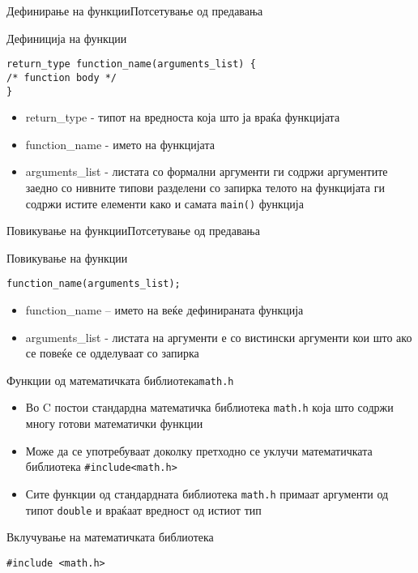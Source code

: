 \begin{frame}[fragile]{Дефинирање на функции}{Потсетување од предавања}
\begin{block}{Дефиниција на функции}
\begin{lstlisting}
return_type function_name(arguments_list) {
/* function body */
}
\end{lstlisting}
\end{block}
\begin{itemize}
    \item return\_type - типот на вредноста која што ја враќа функцијата
    \item function\_name - името на функцијата
    \item arguments\_list - листата со формални аргументи ги содржи аргументите
    заедно со нивните типови разделени со запирка телото на функцијата ги содржи истите елементи како и самата \texttt{main()} функција    
\end{itemize}
\end{frame}

\begin{frame}[fragile]{Повикување на функции}{Потсетување од предавања}
\begin{block}{Повикување на функции}
\begin{lstlisting}
function_name(arguments_list);
\end{lstlisting}
\end{block}
\begin{itemize}
    \item function\_name – името на веќе дефинираната  функција
    \item arguments\_list - листата на аргументи е со вистински аргументи кои
    што ако се повеќе се одделуваат со запирка
\end{itemize}
\end{frame}

\begin{frame}[fragile]{Функции од математичката библиотека}{\texttt{math.h}}
\begin{itemize}
    \item Во C постои стандардна математичка библиотека \texttt{math.h} која што содржи многу готови математички функции
    \item Може да се употребуваат доколку претходно се уклучи математичката
    библиотека \texttt{\#include<math.h>}
    \item Сите функции од стандардната библиотека \texttt{math.h} примаат аргументи од
    типот \texttt{double} и враќаат вредност од истиот тип
\end{itemize}
\begin{block}{Вклучување на математичката библиотека}
\begin{lstlisting}
#include <math.h>
\end{lstlisting}
\end{block}
\end{frame}

